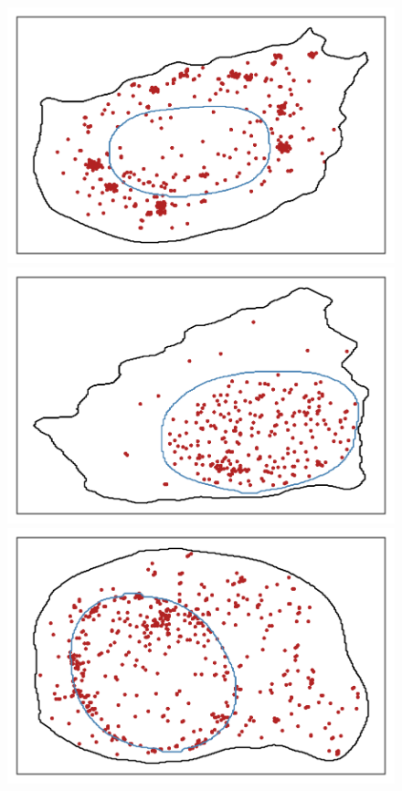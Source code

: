 \begin{figure}[]
	\centering
		\includegraphics[trim={0.5cm 0.5cm 0.5cm 0.5cm},clip,width=\linewidth]{figures/chapter5/plot_foci}
	\endminipage\hfill
		\includegraphics[trim={0.5cm 0.5cm 0.5cm 0.5cm},clip,width=\linewidth]{figures/chapter5/plot_intranuclear}
	\endminipage\hfill
		\includegraphics[trim={0.5cm 0.5cm 0.5cm 0.5cm},clip,width=\linewidth]{figures/chapter5/plot_nuclear}

\end{figure}
